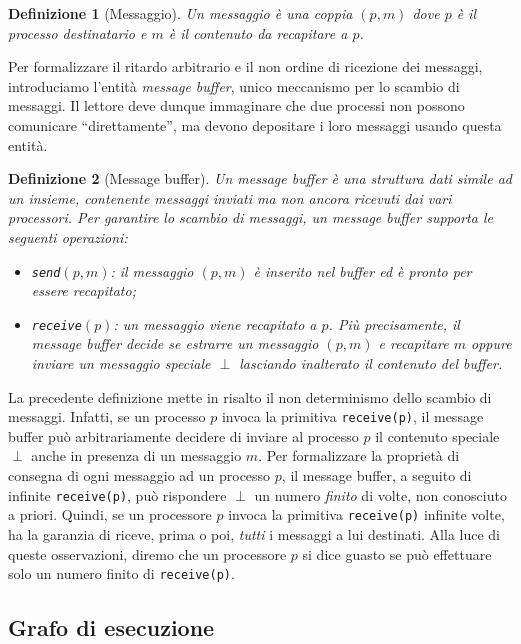 \documentclass{article}
\newtheorem{definizione}{Definizione}
\begin{document}
\begin{definizione}[Messaggio]
  Un messaggio è una coppia $(p,m)$ dove $p$ è il processo
  destinatario e $m$ è il contenuto da recapitare a $p$.
\end{definizione}

Per formalizzare il ritardo arbitrario e il non ordine di ricezione
dei messaggi, introduciamo l'entit\`a \emph{message buffer}, unico
meccanismo per lo scambio di messaggi. Il lettore deve dunque
immaginare che due processi non possono comunicare ``direttamente'',
ma devono depositare i loro messaggi usando questa entit\`a.

\begin{definizione}[Message buffer]
  Un \emph{message buffer} \`e una struttura dati simile ad un
  insieme, contenente messaggi inviati ma non ancora ricevuti dai vari
  processori. Per garantire lo scambio di messaggi, un message buffer
  supporta le seguenti operazioni:
\begin{itemize}
\item \texttt{send$(p,m)$}: il messaggio $(p,m)$ è inserito nel buffer
  ed è pronto per essere recapitato;
\item \texttt{receive$(p)$}: un messaggio viene recapitato a $p$. Più
  precisamente, il message buffer decide se estrarre un messaggio
  $(p,m)$ e recapitare $m$ oppure inviare un messaggio speciale
  $\perp$ lasciando inalterato il contenuto del buffer.
\end{itemize}
\end{definizione}
La precedente definizione mette in risalto il non determinismo dello
scambio di messaggi. Infatti, se un processo $p$ invoca la primitiva
\texttt{receive(p)}, il message buffer può arbitrariamente decidere di
inviare al processo $p$ il contenuto speciale $\perp$ anche in
presenza di un messaggio $m$. Per formalizzare la propriet\`a di
consegna di ogni messaggio ad un processo $p$, il message buffer, a
seguito di infinite \texttt{receive(p)}, può rispondere $\perp$ un
numero \emph{finito} di volte, non conosciuto a priori. Quindi, se un
processore $p$ invoca la primitiva \texttt{receive(p)} infinite volte,
ha la garanzia di riceve, prima o poi, \emph{tutti} i messaggi a lui
destinati. Alla luce di queste osservazioni, diremo che un processore
$p$ si dice guasto se può effettuare solo un numero finito di
\texttt{receive(p)}.

\subsection{Grafo di esecuzione}
\end{document}
